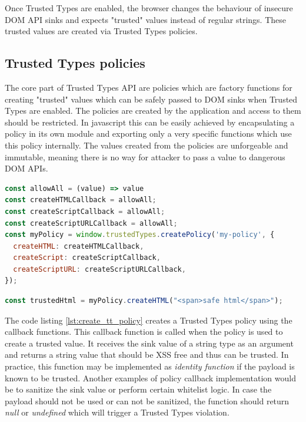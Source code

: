 Once Trusted Types are enabled, the browser changes the behaviour of insecure DOM API sinks and
expects "trusted" values instead of regular strings. These trusted values are created via Trusted
Types policies.

\subsection{Trusted Types policies}
\label{subsec:tt_policy}

The core part of Trusted Types API are policies which are factory functions for creating "trusted"
values which can be safely passed to DOM sinks when Trusted Types are enabled. The policies are
created by the application and access to them should be restricted. In javascript this can be easily
achieved by encapsulating a policy in its own module and exporting only a very specific functions
which use this policy internally. The values created from the policies are unforgeable and
immutable, meaning there is no way for attacker to pass a value to dangerous DOM APIs.

\bigskip
\begin{lstlisting}[language=JavaScript, caption=Creating a Trusted Types policy, label={lst:create_tt_policy}]
const allowAll = (value) => value
const createHTMLCallback = allowAll;
const createScriptCallback = allowAll;
const createScriptURLCallback = allowAll;
const myPolicy = window.trustedTypes.createPolicy('my-policy', {
  createHTML: createHTMLCallback,
  createScript: createScriptCallback,
  createScriptURL: createScriptURLCallback,
});
\end{lstlisting}

\bigskip
\begin{lstlisting}[language=JavaScript, caption=Create trusted value using a policy]
const trustedHtml = myPolicy.createHTML("<span>safe html</span>");
\end{lstlisting}

The code listing \ref{lst:create_tt_policy} creates a Trusted Types policy using the callback
functions. This callback function is called when the policy is used to create a trusted value. It
receives the sink value of a string type as an argument and returns a string value that should be
XSS free and thus can be trusted. In practice, this function may be implemented as \emph{identity
  function} if the payload is known to be trusted. Another examples of policy callback implementation
would be to sanitize the sink value or perform certain whitelist logic. In case the payload should
not be used or can not be sanitized, the function should return \emph{null} or \emph{undefined}
which will trigger a Trusted Types violation.

